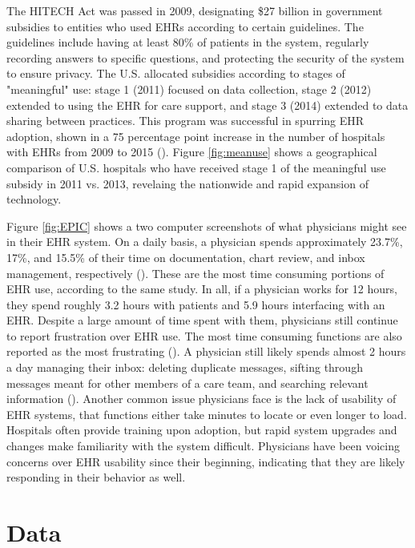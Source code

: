 \documentclass[11pt]{article}
\begin{document}
The HITECH Act was passed in 2009, designating \$27 billion in government subsidies to entities who used EHRs according to certain guidelines. The guidelines include having at least 80\% of patients in the system, regularly recording answers to specific questions, and protecting the security of the system to ensure privacy. The U.S. allocated subsidies according to stages of "meaningful" use: stage 1 (2011) focused on data collection, stage 2 (2012) extended to using the EHR for care support, and stage 3 (2014) extended to data sharing between practices. This program was successful in  spurring EHR adoption, shown in a 75 percentage point increase in the number of hospitals with EHRs from 2009 to 2015 (\cite{stats}). Figure \ref{fig:meanuse} shows a geographical comparison of U.S. hospitals who have received stage 1 of the meaningful use subsidy in 2011 vs. 2013, revelaing the nationwide and rapid expansion of technology. 

Figure \ref{fig:EPIC} shows a two computer screenshots of what physicians might see in their EHR system. On a daily basis, a physician spends approximately 23.7\%, 17\%, and 15.5\% of their time on documentation, chart review, and inbox management, respectively (\cite{arndt2017tethered}). These are the most time consuming portions of EHR use, according to the same study. In all, if a physician works for 12 hours, they spend roughly 3.2 hours with patients and 5.9 hours interfacing with an EHR. Despite a large amount of time spent with them, physicians still continue to report frustration over EHR use. The most time consuming functions are also reported as the most frustrating (\cite{dymek2021building}). A physician still likely spends almost 2 hours a day managing their inbox: deleting duplicate messages, sifting through messages meant for other members of a care team, and searching relevant information (\cite{dymek2021building}). Another common issue physicians face is the lack of usability of EHR systems, that functions either take minutes to locate or even longer to load. Hospitals often provide training upon adoption, but rapid system upgrades and changes make familiarity with the system difficult. Physicians have been voicing concerns over EHR usability since their beginning, indicating that they are likely responding in their behavior as well. 

\section{Data}
\end{document}
